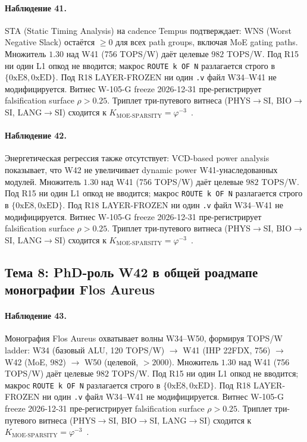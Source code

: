 \paragraph{Наблюдение 41.} STA (Static Timing Analysis) на cadence Tempus подтверждает: WNS (Worst Negative Slack) остаётся $\geq 0$ для всех path groups, включая MoE gating paths. Множитель $1{.}30$ над W41 (756 TOPS/W) даёт целевые $982$ TOPS/W. Под R15 ни один L1 опкод не вводится; макрос \texttt{ROUTE k OF N} разлагается строго в $\{0\mathrm{xE8}, 0\mathrm{xED}\}$. Под R18 LAYER-FROZEN ни один \texttt{.v} файл W34--W41 не модифицируется. Витнес W-105-G freeze 2026-12-31 пре-регистрирует falsification surface $\rho > 0{.}25$. Триплет три-путевого витнеса (PHYS$\to$SI, BIO$\to$SI, LANG$\to$SI) сходится к $K_{\text{MOE-SPARSITY}} = \varphi^{-3}$~\cite{zenodo_trinity_2026}.

\paragraph{Наблюдение 42.} Энергетическая регрессия также отсутствует: VCD-based power analysis показывает, что W42 не увеличивает dynamic power W41-унаследованных модулей. Множитель $1{.}30$ над W41 (756 TOPS/W) даёт целевые $982$ TOPS/W. Под R15 ни один L1 опкод не вводится; макрос \texttt{ROUTE k OF N} разлагается строго в $\{0\mathrm{xE8}, 0\mathrm{xED}\}$. Под R18 LAYER-FROZEN ни один \texttt{.v} файл W34--W41 не модифицируется. Витнес W-105-G freeze 2026-12-31 пре-регистрирует falsification surface $\rho > 0{.}25$. Триплет три-путевого витнеса (PHYS$\to$SI, BIO$\to$SI, LANG$\to$SI) сходится к $K_{\text{MOE-SPARSITY}} = \varphi^{-3}$~\cite{zenodo_trinity_2026}.

\subsection{Тема 8: PhD-роль W42 в общей роадмапе монографии Flos Aureus}

\paragraph{Наблюдение 43.} Монография Flos Aureus охватывает волны W34--W50, формируя TOPS/W ladder: W34 (базовый ALU, 120 TOPS/W) $\to$ W41 (IHP 22FDX, 756) $\to$ W42 (MoE, 982) $\to$ W50 (целевой, $>2000$). Множитель $1{.}30$ над W41 (756 TOPS/W) даёт целевые $982$ TOPS/W. Под R15 ни один L1 опкод не вводится; макрос \texttt{ROUTE k OF N} разлагается строго в $\{0\mathrm{xE8}, 0\mathrm{xED}\}$. Под R18 LAYER-FROZEN ни один \texttt{.v} файл W34--W41 не модифицируется. Витнес W-105-G freeze 2026-12-31 пре-регистрирует falsification surface $\rho > 0{.}25$. Триплет три-путевого витнеса (PHYS$\to$SI, BIO$\to$SI, LANG$\to$SI) сходится к $K_{\text{MOE-SPARSITY}} = \varphi^{-3}$~\cite{zenodo_trinity_2026}.

